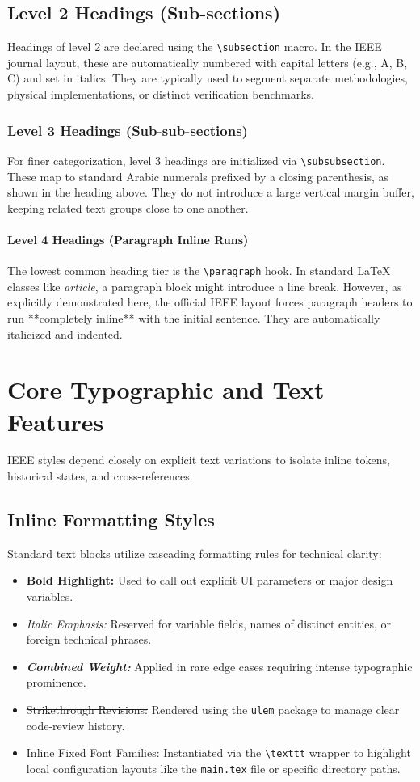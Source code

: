 \documentclass[10pt, journal, compsoc]{IEEEtran}
\begin{document}
\subsection{Level 2 Headings (Sub-sections)}
Headings of level 2 are declared using the \texttt{\textbackslash subsection} macro. In the IEEE journal layout, these are automatically numbered with capital letters (e.g., A, B, C) and set in italics. They are typically used to segment separate methodologies, physical implementations, or distinct verification benchmarks.

\subsubsection{Level 3 Headings (Sub-sub-sections)}
For finer categorization, level 3 headings are initialized via \texttt{\textbackslash subsubsection}. These map to standard Arabic numerals prefixed by a closing parenthesis, as shown in the heading above. They do not introduce a large vertical margin buffer, keeping related text groups close to one another.

\paragraph{Level 4 Headings (Paragraph Inline Runs)}
The lowest common heading tier is the \texttt{\textbackslash paragraph} hook. In standard LaTeX classes like \textit{article}, a paragraph block might introduce a line break. However, as explicitly demonstrated here, the official IEEE layout forces paragraph headers to run **completely inline** with the initial sentence. They are automatically italicized and indented.

\section{Core Typographic and Text Features}
IEEE styles depend closely on explicit text variations to isolate inline tokens, historical states, and cross-references.

\subsection{Inline Formatting Styles}
Standard text blocks utilize cascading formatting rules for technical clarity:
\begin{itemize}
	\item \textbf{Bold Highlight:} Used to call out explicit UI parameters or major design variables.
	\item \textit{Italic Emphasis:} Reserved for variable fields, names of distinct entities, or foreign technical phrases.
	\item \textbf{\textit{Combined Weight:}} Applied in rare edge cases requiring intense typographic prominence.
	\item \sout{Strikethrough Revisions:} Rendered using the \texttt{ulem} package to manage clear code-review history.
	\item Inline Fixed Font Families: Instantiated via the \texttt{\textbackslash texttt} wrapper to highlight local configuration layouts like the \texttt{main.tex} file or specific directory paths.
\end{itemize}
\end{document}
